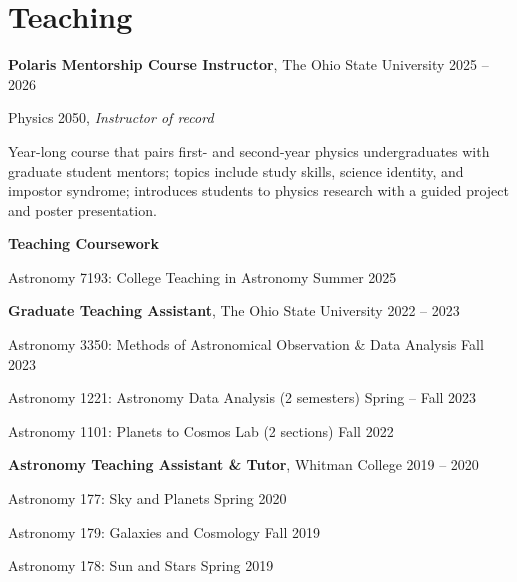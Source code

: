 \section*{Teaching}

{\bf Polaris Mentorship Course Instructor}, The Ohio State University
\hfill 2025 -- 2026

Physics 2050, {\it Instructor of record}

Year-long course that pairs first- and second-year physics undergraduates with graduate student mentors; topics include study skills, science identity, and impostor syndrome; introduces students to physics research with a guided project and poster presentation.

\vspace{12pt}
\noindent
{\bf Teaching Coursework}

Astronomy 7193: College Teaching in Astronomy
\hfill Summer 2025

\vspace{12pt}
\noindent
\textbf{Graduate Teaching Assistant}, The Ohio State University
\hfill 2022 -- 2023

Astronomy 3350: Methods of Astronomical Observation \& Data Analysis
\hfill Fall 2023

Astronomy 1221: Astronomy Data Analysis (2 semesters)
\hfill Spring -- Fall 2023

Astronomy 1101: Planets to Cosmos Lab (2 sections)
\hfill Fall 2022

\vspace{12pt}
\noindent
\textbf{Astronomy Teaching Assistant \& Tutor}, Whitman College 
\hfill 2019 -- 2020

Astronomy 177: Sky and Planets
\hfill Spring 2020

Astronomy 179: Galaxies and Cosmology
\hfill Fall 2019

Astronomy 178: Sun and Stars
\hfill Spring 2019\\
\vspace{-12pt}
